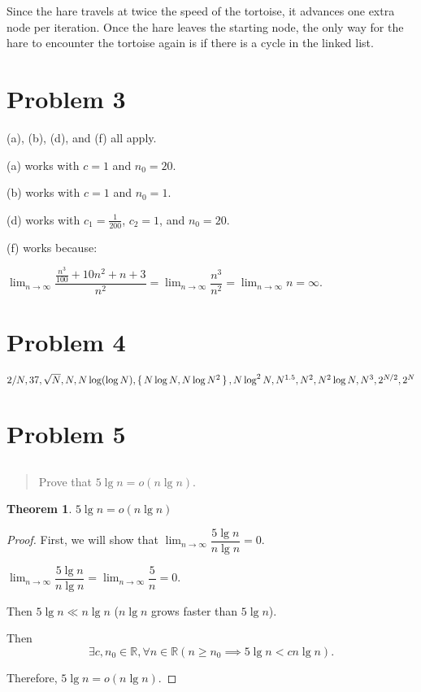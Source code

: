 \documentclass[12pt]{article}
\newtheorem{theorem}{Theorem}[section]
\theoremstyle{definition}
\begin{document}
Since the hare travels at twice the speed of the tortoise, it
advances one extra node per iteration. Once the hare leaves the
starting node, the only way for the hare to encounter the tortoise
again is if there is a cycle in the linked list.

\newpage

\section{Problem 3}

(a), (b), (d), and (f) all apply.

(a) works with $c = 1$ and $n_0 = 20$.

(b) works with $c = 1$ and $n_0 = 1$.

(d) works with $c_1 = \frac{1}{200}$, $c_2 = 1$, and $n_0 = 20$.

(f) works because:

$\lim_{n \to \infty} \dfrac{\frac{n^3}{100} + 10n^2
+ n + 3}{n^2} = \lim_{n \to \infty} \dfrac{n^3}{n^2} = \lim_{n \to
\infty} n = \infty$.

\section{Problem 4}

$2 / N, 37, \sqrt N, N, N \log(\log N), \set{N \log N, N \log N^2}, N \log^2
N, \\ N^{1.5}, N^2, N^2 \log N, N^3, 2^{N / 2}, 2^N$

\section{Problem 5}

\subsection{}

\begin{quote}
  Prove that $5 \lg n = o(n \lg n)$.
\end{quote}

\begin{theorem}
  $5 \lg n = o(n \lg n)$
\end{theorem}

\begin{proof}
  First, we will show that $\lim_{n \to \infty} \dfrac{5 \lg n}{n \lg n} = 0$.

  $\lim_{n \to \infty} \dfrac{5 \lg n}{n \lg n} = \lim_{n \to
  \infty} \dfrac{5}{n} = 0.$

  Then $5 \lg n \ll n \lg n$ ($n \lg n$ grows faster than $5 \lg n$).

  Then
  $$ \exists c, n_0 \in \mathbb R, \forall n \in \mathbb R (n \geq
  n_0 \implies 5 \lg n < cn \lg n). $$

  Therefore, $5 \lg n = o(n \lg n)$.
\end{proof}
\end{document}
